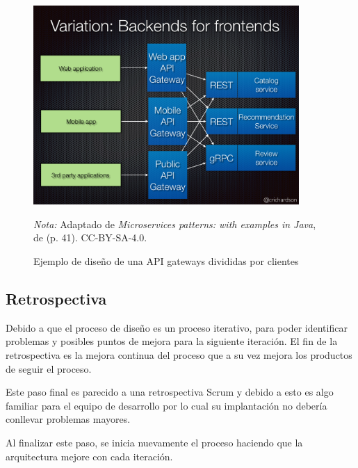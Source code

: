 \vspace{1em}
\begin{figure}[H]
  \caption{Ejemplo de diseño de una API gateways divididas por clientes}
  \begin{center}
    \includegraphics[width=0.90\textwidth]{src/assets/metodologia/apigateway_cliente}
    \label{fig:api_gateway_cliente}
  \end{center}
  \textit{Nota:} Adaptado de \textit{Microservices patterns: with examples in Java}, de \cite{richardson2018microservices}
  (p. 41). CC-BY-SA-4.0.
\end{figure}

\subsection{Retrospectiva}

Debido a que el proceso de diseño es un proceso iterativo, para poder identificar problemas
y posibles puntos de mejora para la siguiente iteración.
El fin de la retrospectiva es la mejora continua del proceso que a su vez mejora los productos
de seguir el proceso.

Este paso final es parecido a una retrospectiva Scrum y debido a esto es algo familiar para
el equipo de desarrollo por lo cual su implantación no debería conllevar problemas mayores.

Al finalizar este paso, se inicia nuevamente el proceso haciendo que la arquitectura
mejore con cada iteración.

